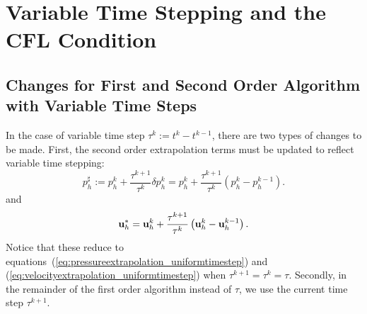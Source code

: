 \documentclass[letterpaper]{erdc}
\begin{document}
%
%
%
\section{Variable Time Stepping and the CFL Condition}\label{sec:VariableTimeSteppingAndCFL}

%
%
%
\subsection{Changes for First and Second Order Algorithm with Variable Time Steps}\label{sec:BDF1VariableTimeSteppingAlgorithm}
In the case of variable time step  $\tau^{k} := t^{k}-t^{k-1}$, there are two types of changes to be made.  First, the second order extrapolation terms must be updated to reflect variable time stepping:
\begin{equation}
  p^{\sharp}_h := p_h^{k} + \frac{\tau^{k+1}}{\tau^{k}}\delta p_h^{k} = p_h^{k} + \frac{\tau^{k+1}}{\tau^{k}}\left( p_h^{k} - p_h^{k-1} \right).
\end{equation}
and 
\begin{equation}
  \textbf{u}_h^{*} = \textbf{u}_h^{k} + \frac{\tau^{k+1}}{\tau^k}\left( \textbf{u}_h^{k} - \textbf{u}_h^{k-1}\right).
\end{equation}
Notice that these reduce to equations~(\ref{eq:pressureextrapolation_uniformtimestep}) and (\ref{eq:velocityextrapolation_uniformtimestep}) when $\tau^{k+1} = \tau^{k} = \tau$.  Secondly, in the remainder of the first order algorithm instead of $\tau$, we use the current time step $\tau^{k+1}$.





%
%
\end{document}
